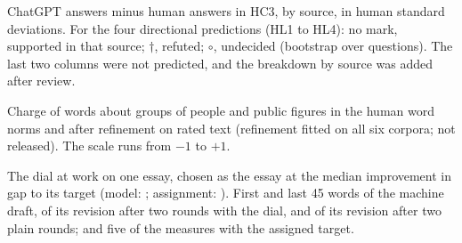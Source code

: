 \begin{table}[h]
\centering\sffamily\scriptsize
\caption{ChatGPT answers minus human answers in HC3, by source, in human standard deviations. For the four directional predictions (HL1 to HL4): no mark, supported in that source; $\dagger$, refuted; $\circ$, undecided (bootstrap over questions). The last two columns were not predicted, and the breakdown by source was added after review.}
\label{tab:sources}

\end{table}

\begin{table}[h]
\centering\sffamily\scriptsize
\caption{Charge of \grpTerms{} words about groups of people and public figures in the human word norms and after refinement on rated text (refinement fitted on all six corpora; not released). The scale runs from $-1$ to $+1$.}
\label{tab:groups}

\end{table}

\begin{table}[h]
\centering\sffamily\scriptsize
\caption{The dial at work on one essay, chosen as the essay at the median improvement in gap to its target (model: \exTier; assignment: \exPrompt). First and last 45 words of the machine draft, of its revision after two rounds with the dial, and of its revision after two plain rounds; and five of the measures with the assigned target.}
\label{tab:excerpt}

\end{table}

\figExtended
